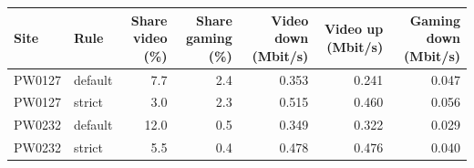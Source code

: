 \begin{tabular}{llrrrrr}
\toprule
Site & Rule & Share video (\%) & Share gaming (\%) & Video down (Mbit/s) & Video up (Mbit/s) & Gaming down (Mbit/s) \\
\midrule
PW0127 & default & 7.7 & 2.4 & 0.353 & 0.241 & 0.047 \\
PW0127 & strict & 3.0 & 2.3 & 0.515 & 0.460 & 0.056 \\
PW0232 & default & 12.0 & 0.5 & 0.349 & 0.322 & 0.029 \\
PW0232 & strict & 5.5 & 0.4 & 0.478 & 0.476 & 0.040 \\
\bottomrule
\end{tabular}
